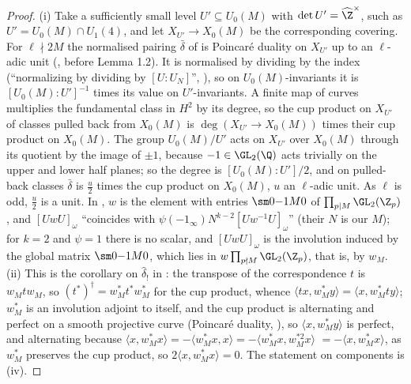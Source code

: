 \begin{proof}
(i) Take a sufficiently small level $U'\subseteq U_0(M)$ with $\det U'=\widehat\Z^\times$, such as $U'=U_0(M)\cap U_1(4)$, and let $X_{U'}\to X_0(M)$ be the corresponding covering. For $\ell\nmid2M$ the
normalised pairing $\bar\delta$ of \cite[Section 1.5.2]{DFG04} is Poincar\'e duality on $X_{U'}$ up to an $\ell$-adic unit (\cite[Section 1.5.2]{DFG04}, before Lemma 1.2). It is normalised by dividing
by the index (``normalizing by dividing by $[U:U_N]$'', \cite[Section 1.5.2]{DFG04}), so on $U_0(M)$-invariants it is $[U_0(M):U']^{-1}$ times its value on $U'$-invariants. A finite map of curves
multiplies the fundamental class in $H^2$ by its degree, so the cup product on $X_{U'}$ of classes pulled back from $X_0(M)$ is $\deg(X_{U'}\to X_0(M))$ times their cup product on $X_0(M)$. The group
$U_0(M)/U'$ acts on $X_{U'}$ over $X_0(M)$ through its quotient by the image of $\pm1$, because $-1\in\GL_2(\Q)$ acts trivially on the upper and lower half planes; so the degree is
$[U_0(M):U']/2$, and on pulled-back classes $\bar\delta$ is $\frac u2$ times the cup product on $X_0(M)$, $u$ an $\ell$-adic unit. As $\ell$ is odd, $\frac u2$ is a unit. In \cite[Section 1.5.3]{DFG04}, $w$ is the
element with entries $\sm0{-1}M0$ of $\prod_{p\mid M}\GL_2(\Z_p)$, and $[UwU]_\omega$ ``coincides with $\psi(-1_\infty)N^{k-2}[Uw^{-1}U]_\omega$'' (their $N$ is our $M$); for $k=2$ and $\psi=1$
there is no scalar, and $[UwU]_\omega$ is the involution induced by the global matrix $\sm0{-1}M0$, which lies in $w\prod_{p\nmid M}\GL_2(\Z_p)$, that is, by $w_M$. (ii) This is the corollary on $\hat\delta_!$ in : the transpose of the correspondence $t$ is $w_Mtw_M$,
so $(t^*)^\dagger=w_M^*t^*w_M^*$ for the cup product, whence $\langle tx,w_M^*y\rangle=\langle x,w_M^*ty\rangle$; $w_M^*$ is an involution adjoint to itself, and the cup product is alternating and perfect
on a smooth projective curve (Poincar\'e duality, ), so $\langle x,w_M^*y\rangle$ is perfect, and alternating because $\langle x,w_M^*x\rangle=-\langle w_M^*x,x\rangle=-\langle w_M^*x,w_M^{*2}x\rangle$ $=-\langle x,w_M^*x\rangle$, as $w_M^*$
preserves the cup product, so $2\langle x,w_M^*x\rangle=0$. The statement on components is (iv).
\end{proof}

